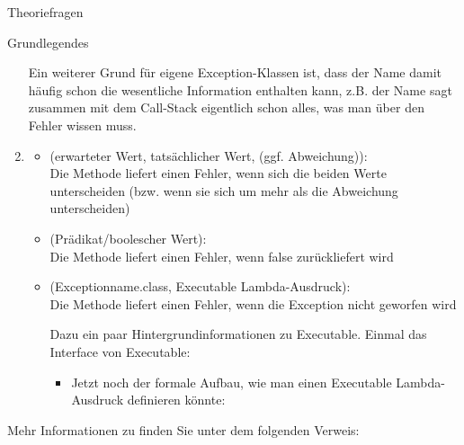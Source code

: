 \documentclass{../tuda-exercise}
\begin{document}
\begin{task}[credit=\stars{0}{3}]{Theoriefragen}
\begin{subtask*}{Grundlegendes}
\begin{solution}
\begin{enumerate}
          Ein weiterer Grund für eigene Exception-Klassen ist, dass der Name damit häufig schon
          die wesentliche Information enthalten kann, z.B. der Name
           sagt zusammen mit dem Call-Stack eigentlich
          schon alles, was man über den Fehler wissen muss.
          \item
          \begin{itemize}
            \item {}(erwarteter Wert, tatsächlicher Wert, (ggf. Abweichung)):
            \\
            Die Methode liefert einen Fehler, wenn sich die beiden Werte unterscheiden (bzw. wenn
            sie sich um mehr als die Abweichung unterscheiden)
            \item {}(Prädikat/boolescher Wert):
            \\
            Die Methode liefert einen Fehler, wenn false zurückliefert wird

            \clearpage

            \item {}(Exceptionname.\textcolor{keywordcolor}{class},
            Executable Lambda-Ausdruck):
            \\
            Die Methode liefert einen Fehler, wenn die Exception nicht geworfen wird

            \br

            Dazu ein paar Hintergrundinformationen zu Executable. Einmal das Interface von
            Executable:

            
            \begin{itemize}
              \item Jetzt noch der formale Aufbau, wie man einen Executable Lambda-Ausdruck
              definieren könnte:
              \begin{center}
              \end{center}
            \end{itemize}
          \end{itemize}
        \end{enumerate}

        \begin{note}[title=Information:]
          Mehr Informationen zu  finden Sie unter dem folgenden Verweis:


\end{note}
\end{solution}
\end{subtask*}
\end{task}
\end{document}
